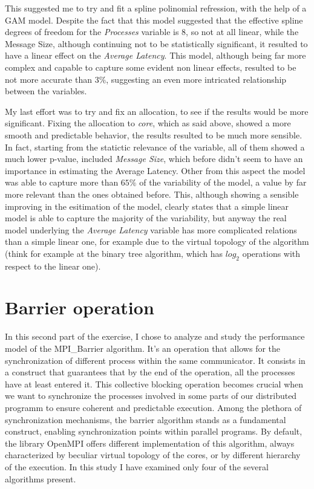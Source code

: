 \documentclass{article}
\begin{document}
	This suggested me to try and fit a spline polinomial refression, with the help of a GAM model. Despite the fact that this model suggested that the effective spline degrees of freedom for the \textit{Processes} variable is 8, so not at all linear, while the Message Size, although continuing not to be statistically significant, it resulted to have a linear effect on the \textit{Average Latency}.
	This model, although being far more complex and capable to capture some evident non linear  effects, resulted to be not more accurate than $3\%$, suggesting an even more intricated relationship between the variables.
	
	My last effort was to try and fix an allocation, to see if the results would be more significant.
	Fixing the allocation to \textit{core}, which as said above, showed a more smooth and predictable behavior, the results resulted to be much more sensible.
	In fact, starting from the statictic relevance of the variable, all of them showed a much lower p-value, included \textit{Message Size}, which before didn't seem to have an importance in estimating the Average Latency.
	Other from this aspect the model was able to capture more than $65\%$ of the variability of the model, a value by far more relevant than the ones obtained before. This, although showing a sensible improving in the esitimation of the model, clearly states that a simple linear model is able to capture the majority of the variability, but anyway the real model underlying the \textit{Average Latency} variable has more complicated relations than a simple linear one, for example due to the virtual topology of the algorithm (think for example at the binary tree algorithm, which has $log_2$ operations with respect to the linear one).
	
	
	
	\section{Barrier operation}
	
	In this second part of the exercise, I chose to analyze and study the performance model of the MPI\_Barrier algorithm. It's an operation that allows for the synchronization of different process within the same communicator. It consists in a construct that guarantees that by the end of the operation, all the processes have at least entered it.
	This collective blocking operation becomes crucial when we want to synchronize the processes involved in some parts of our distributed programm to ensure coherent and predictable execution. Among the plethora of synchronization mechanisms, the barrier algorithm stands as a fundamental construct, enabling synchronization points within parallel programs.
	By default, the library OpenMPI offers different implementation of this algorithm, always characterized by beculiar virtual topology of the cores, or by different hierarchy of the execution. In this study I have examined only four of the  several algorithms present.
	
\end{document}
